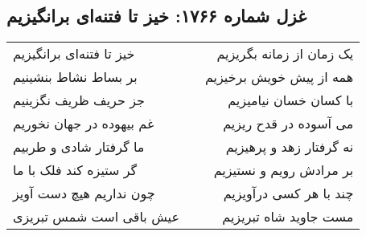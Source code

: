 \begin{center}
\section*{غزل شماره ۱۷۶۶: خیز تا فتنه‌ای برانگیزیم}
\label{sec:1766}
\begin{longtable}{l p{0.5cm} r}
خیز تا فتنه‌ای برانگیزیم
&&
یک زمان از زمانه بگریزیم
\\
بر بساط نشاط بنشینیم
&&
همه از پیش خویش برخیزیم
\\
جز حریف ظریف نگزینیم
&&
با کسان خسان نیامیزیم
\\
غم بیهوده در جهان نخوریم
&&
می آسوده در قدح ریزیم
\\
ما گرفتار شادی و طربیم
&&
نه گرفتار زهد و پرهیزیم
\\
گر ستیزه کند فلک با ما
&&
بر مرادش رویم و نستیزیم
\\
چون نداریم هیچ دست آویز
&&
چند با هر کسی درآویزیم
\\
عیش باقی است شمس تبریزی
&&
مست جاوید شاه تبریزیم
\\
\end{longtable}
\end{center}
